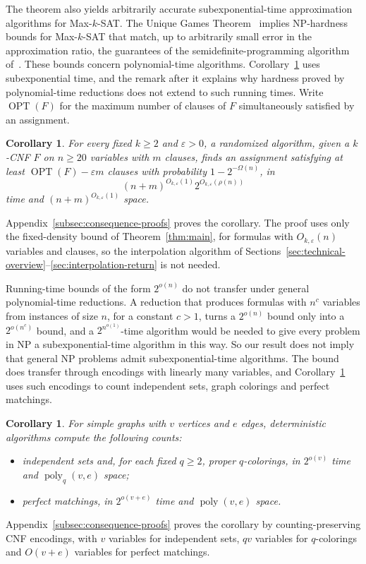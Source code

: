 \documentclass[11pt,reqno]{amsart}
\numberwithin{equation}{section}
\newtheorem{corollary}[theorem]{Corollary}
\theoremstyle{definition}\newtheorem{definition}[theorem]{Definition}
\theoremstyle{remark}\newtheorem{remark}[theorem]{Remark}
\newcommand{\poly}{\operatorname{poly}}
\renewcommand{\ge}{\geqslant}
\begin{document}
The theorem also yields arbitrarily accurate subexponential-time
approximation algorithms for Max-$k$-SAT.
The Unique Games
Theorem~\cite[Section~8.1]{OpenAIUGC26} implies NP-hardness bounds
for Max-$k$-SAT that match, up to arbitrarily small error in the
approximation ratio, the guarantees of the semidefinite-programming
algorithm of~\cite{Rag08}. These bounds concern polynomial-time
algorithms. Corollary~\ref{cor:max-sat-approximation} uses
subexponential time, and the remark after it explains why hardness
proved by polynomial-time reductions does not extend to such running
times.
Write $\operatorname{OPT}(F)$ for the maximum number of clauses of $F$
simultaneously satisfied by an assignment.
\begin{corollary}\label{cor:max-sat-approximation}
For every fixed $k\ge2$ and $\varepsilon>0$, a randomized algorithm,
given a $k$-CNF $F$ on $n\ge20$ variables with $m$ clauses,
finds an assignment satisfying at least
$\operatorname{OPT}(F)-\varepsilon m$ clauses with probability
$1-2^{-\Omega(n)}$, in
\[
 (n+m)^{O_{k,\varepsilon}(1)}2^{O_{k,\varepsilon}(\rho(n))}
\]
time and $(n+m)^{O_{k,\varepsilon}(1)}$ space.
\end{corollary}
Appendix~\ref{subsec:consequence-proofs} proves the corollary. The
proof uses only the fixed-density bound of Theorem~\ref{thm:main}, for
formulas with $O_{k,\varepsilon}(n)$ variables and clauses, so the
interpolation algorithm of
Sections~\ref{sec:technical-overview}--\ref{sec:interpolation-return}
is not needed.

Running-time bounds of the form $2^{o(n)}$ do not transfer under
general polynomial-time reductions. A reduction that produces formulas
with $n^c$ variables from instances of size $n$, for a constant $c>1$,
turns a $2^{o(n)}$ bound only into a $2^{o(n^c)}$ bound, and a
$2^{n^{o(1)}}$-time algorithm would be needed to give every problem in
NP a subexponential-time algorithm in this way. So our result does not
imply that general NP problems admit subexponential-time algorithms.
The bound does transfer through encodings with linearly many
variables, and Corollary~\ref{cor:graph-counting} uses such encodings
to count independent sets, graph colorings and perfect matchings.

\begin{corollary}\label{cor:graph-counting}
For simple graphs with $v$ vertices and $e$ edges, deterministic
algorithms compute the following counts:
\begin{itemize}
\item independent sets and, for each fixed $q\ge2$, proper
$q$-colorings, in $2^{o(v)}$ time and $\poly_q(v,e)$ space;
\item perfect matchings, in $2^{o(v+e)}$ time and $\poly(v,e)$ space.
\end{itemize}
\end{corollary}
Appendix~\ref{subsec:consequence-proofs} proves the corollary by
counting-preserving CNF encodings, with $v$ variables for independent
sets, $qv$ variables for $q$-colorings and $O(v+e)$ variables for
perfect matchings.
\end{document}
